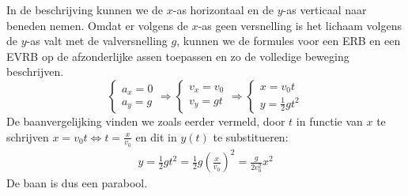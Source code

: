 \documentclass{ximera}
\begin{document}

In de beschrijving kunnen we de $x$-as horizontaal en de $y$-as verticaal naar beneden nemen. Omdat er volgens de $x$-as geen versnelling is het lichaam volgens de $y$-as valt met de valversnelling $g$, kunnen we de formules voor een ERB en een EVRB op de afzonderlijke assen toepassen en zo de volledige beweging beschrijven.
\begin{equation*}
	\left\{
	\begin{array}{l}
	a_x=0\\
	a_y=g
	\end{array}
	\right.
	\Rightarrow
	\left\{
	\begin{array}{l}
	v_x=v_0\\
	v_y=gt
	\end{array}
	\right.
	\Rightarrow
	\left\{
	\begin{array}{l}
	x=v_0t\\
	y=\frac{1}{2}gt^2
	\end{array}
	\right.
\end{equation*}
De baanvergelijking vinden we zoals eerder vermeld, door $t$ in functie van $x$ te schrijven $x=v_0t\Leftrightarrow t=\frac{x}{v_0}$ en dit in $y(t)$ te substitueren:
\begin{eqnarray*}
	y=\frac{1}{2}gt^2=\frac{1}{2}g\left(\frac{x}{v_0}\right)^2=\frac{g}{2v_0^2}x^2
\end{eqnarray*}
De baan is dus een parabool.
\end{document}
